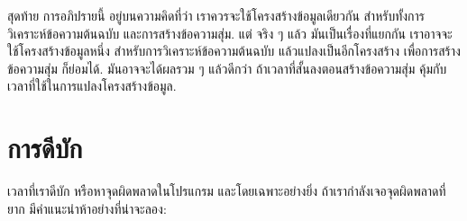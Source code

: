 
สุดท้าย การอภิปรายนี้ อยู่บนความคิดที่ว่า เราควรจะใช้โครงสร้างข้อมูลเดียวกัน สำหรับทั้งการวิเคราะห์ข้อความต้นฉบับ และการสร้างข้อความสุ่ม.
แต่ จริง ๆ แล้ว มันเป็นเรื่องที่แยกกัน
เราอาจจะใช้โครงสร้างข้อมูลหนึ่ง สำหรับการวิเคราะห์ข้อความต้นฉบับ
แล้วแปลงเป็นอีกโครงสร้าง เพื่อการสร้างข้อความสุ่ม ก็ย่อมได้.
มันอาจจะได้ผลรวม ๆ แล้วดีกว่า ถ้าเวลาที่สั้นลงตอนสร้างข้อความสุ่ม คุ้มกับเวลาที่ใช้ในการแปลงโครงสร้างข้อมูล.


\section{การดีบัก}


เวลาที่เราดีบัก หรือหาจุดผิดพลาดในโปรแกรม
และโดยเฉพาะอย่างยิ่ง ถ้าเรากำลังเจอจุดผิดพลาดที่ยาก
มีคำแนะนำห้าอย่างที่น่าจะลอง:

